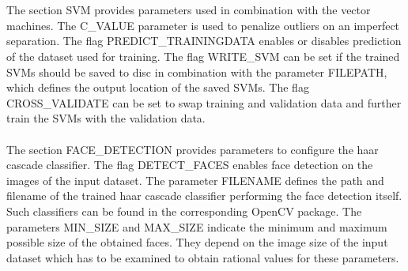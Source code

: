 \\
\\
The section SVM provides parameters used in combination with the vector machines. The C\_VALUE parameter is used to penalize outliers on an imperfect separation. The flag PREDICT\_TRAININGDATA enables or disables prediction of the dataset used for training. The flag WRITE\_SVM can be set if the trained SVMs should be saved to disc in combination with the parameter FILEPATH, which defines the output location of the saved SVMs. The flag CROSS\_VALIDATE can be set to swap training and validation data and further train the SVMs with the validation data.
\\
\\
The section FACE\_DETECTION provides parameters to configure the haar cascade classifier. The flag DETECT\_FACES enables face detection on the images of the input dataset. The parameter FILENAME defines the path and filename of the trained haar cascade classifier performing the face detection itself. Such classifiers can be found in the corresponding OpenCV package. The parameters MIN\_SIZE and MAX\_SIZE indicate the minimum and maximum possible size of the obtained faces. They depend on the image size of the input dataset which has to be examined to obtain rational values for these parameters.
